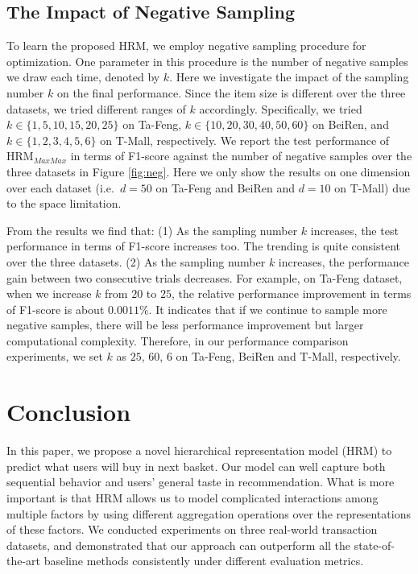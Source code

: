 \documentclass[10pt,journal,compsoc]{IEEEtran}
\begin{document}
\subsection{The Impact of Negative Sampling}
To learn the proposed HRM, we employ negative sampling procedure for optimization. One parameter in this procedure is the number of negative samples we draw each time, denoted by $k$. Here we investigate the impact of the sampling number $k$ on the final performance. Since the item size is different over the three datasets, we tried different ranges of $k$ accordingly. Specifically, we tried $k\in \{1,5,10,15,20,25\}$ on Ta-Feng, $k\in \{10,20,30,40,50,60\}$ on BeiRen, and $k\in \{1,2,3,4,5,6\}$ on T-Mall, respectively. We report the test performance of HRM$_{MaxMax}$ in terms of F1-score against the number of negative samples over the three datasets in Figure \ref{fig:neg}. Here we only show the results on one dimension over each dataset (i.e.~$d=50$ on Ta-Feng and BeiRen and $d=10$ on T-Mall) due to the space limitation.

From the results we find that: (1) As the sampling number $k$ increases, the test performance in terms of F1-score increases too. The trending is quite consistent over the three datasets. (2) As the sampling number $k$ increases, the performance gain between two consecutive trials decreases. For example, on Ta-Feng dataset, when we increase $k$ from $20$ to $25$, the relative performance improvement in terms of F1-score is about $0.0011\%$. It indicates that if we continue to sample more negative samples, there will be less performance improvement but larger computational complexity. Therefore, in our performance comparison experiments, we set $k$ as $25$, $60$, $6$ on Ta-Feng, BeiRen and T-Mall, respectively.

\section{Conclusion}
In this paper, we propose a novel hierarchical representation model (HRM) to predict what users will buy in next basket. Our model can well capture both sequential behavior and users' general taste in recommendation. What is more important is that HRM allows us to model complicated interactions among multiple factors by using different  aggregation operations over the representations of these factors. We conducted experiments on three real-world transaction datasets, and demonstrated that our approach can outperform all the state-of-the-art baseline methods consistently under different evaluation metrics.
\end{document}
